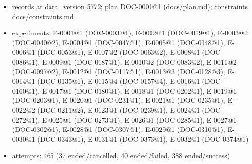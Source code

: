 \documentclass[11pt]{article}
\begin{document}
\begin{itemize}
\item records at data\_version 5772; plan DOC-0001@1 (docs/plan.md); constraints docs/constraints.md
\item experiments: E-0001@1 (DOC-0003@1), E-0002@1 (DOC-0019@1), E-0003@2 (DOC-0040@2), E-0004@1 (DOC-0047@1), E-0005@1 (DOC-0048@1), E-0006@1 (DOC-0053@1), E-0007@2 (DOC-0063@2), E-0008@1 (DOC-0086@1), E-0009@1 (DOC-0087@1), E-0010@2 (DOC-0083@2), E-0011@2 (DOC-0097@2), E-0012@1 (DOC-0117@1), E-0013@3 (DOC-0128@3), E-0014@1 (DOC-0135@1), E-0015@4 (DOC-0157@4), E-0016@1 (DOC-0160@1), E-0017@1 (DOC-0180@1), E-0018@1 (DOC-0202@1), E-0019@1 (DOC-0203@1), E-0020@1 (DOC-0231@1), E-0021@1 (DOC-0235@1), E-0022@2 (DOC-0211@2), E-0023@1 (DOC-0239@1), E-0024@1 (DOC-0272@1), E-0025@1 (DOC-0273@1), E-0026@1 (DOC-0285@1), E-0027@1 (DOC-0302@1), E-0028@1 (DOC-0307@1), E-0029@1 (DOC-0310@1), E-0030@1 (DOC-0343@1), E-0031@1 (DOC-0373@1), E-0032@1 (DOC-0374@1)
\item attempts: 465 (37 ended/cancelled, 40 ended/failed, 388 ended/success)

\end{itemize}
\end{document}
